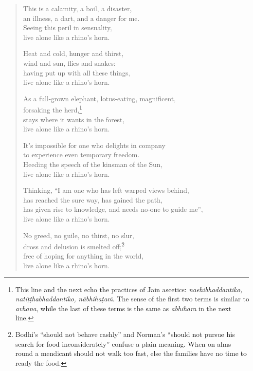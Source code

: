 \documentclass[12pt,openany]{book}%
\begin{document}
\begin{verse}
This is a calamity, a boil, a disaster, \\
an illness, a dart, and a danger for me. \\
Seeing this peril in sensuality, \\
live alone like a rhino’s horn. 

Heat and cold, hunger and thirst, \\
wind and sun, flies and snakes: \\
having put up with all these things, \\
live alone like a rhino’s horn. 

As a full-grown elephant, lotus-eating, magnificent, \\
forsaking the herd,\footnote{This line and the next echo the practices of Jain ascetics: \textit{naehibhaddantiko, \textsanskrit{natiṭṭhabhaddantiko}, \textsanskrit{nābhihaṭaṁ}}. The sense of the first two terms is similar to \textit{\textsanskrit{avhāna}}, while the last of these terms is the same as \textit{\textsanskrit{abhihāra}} in the next line. } \\
stays where it wants in the forest, \\
live alone like a rhino’s horn. 

It’s impossible for one who delights in company \\
to experience even temporary freedom. \\
Heeding the speech of the kinsman of the Sun, \\
live alone like a rhino’s horn. 

Thinking, “I am one who has left warped views behind, \\
has reached the sure way, has gained the path, \\
has given rise to knowledge, and needs no-one to guide me”, \\
live alone like a rhino’s horn. 

No greed, no guile, no thirst, no slur, \\
dross and delusion is smelted off;\footnote{Bodhi’s “should not behave rashly” and Norman’s “should not pursue his search for food inconsiderately” confuse a plain meaning. When on alms round a mendicant should not walk too fast, else the families have no time to ready the food. } \\
free of hoping for anything in the world, \\
live alone like a rhino’s horn. 


\end{verse}
\end{document}
